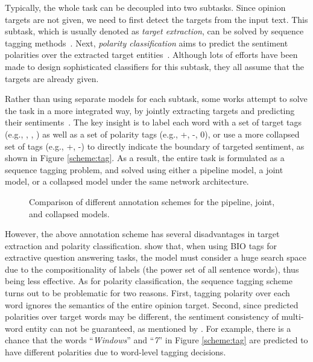 \documentclass[11pt,a4paper]{article}
\begin{document}
Typically, the whole task can be decoupled into two subtasks.
Since opinion targets are not given, we need to first detect the targets from the input text.
This subtask, which is usually denoted as \emph{target extraction}, can be solved by sequence tagging methods~\cite{jakob2010extracting,liu2015fine,wang2016recursive,poria2016aspect,shu2017lifelong,he2017unsupervised,xu2018double}.
Next, \emph{polarity classification} aims to predict the sentiment polarities over the extracted target entities~\cite{jiang2011target,dong2014adaptive,tang2015effective,wang2016attention,chen2017recurrent,xue2018aspect,li2018transformation,fan2018multi}. 
Although lots of efforts have been made to design sophisticated classifiers for this subtask, they all assume that the targets are already given.

Rather than using separate models for each subtask, some works attempt to solve the task in a more integrated way, by jointly extracting targets and predicting their sentiments~\cite{mitchell2013open,zhang2015neural,li2018unified}.
The key insight is to label each word with a set of target tags (e.g., , , ) as well as a set of polarity tags (e.g., +, -, 0), or use a more collapsed set of tags (e.g., +, -) to directly indicate the boundary of targeted sentiment, as shown in Figure \ref{scheme:tag}. 
As a result, the entire task is formulated as a sequence tagging problem, and solved using either a pipeline model, a joint model, or a collapsed model under the same network architecture.

\begin{figure*}
  \centering
  \hspace{0.3in}  
  \caption{Comparison of different annotation schemes for the pipeline, joint, and collapsed models.}
  \label{fig:scheme} \end{figure*}

However, the above annotation scheme has several disadvantages in target extraction and polarity classification.
\citet{lee2016learning} show that, when using BIO tags for extractive question answering tasks, the model must consider a huge search space due to the compositionality of labels (the power set of all sentence words), thus being less effective.
As for polarity classification, the sequence tagging scheme turns out to be problematic for two reasons. 
First, tagging polarity over each word ignores the semantics of the entire opinion target.
Second, since predicted polarities over target words may be different, the sentiment consistency of multi-word entity can not be guaranteed, as mentioned by \citet{li2018unified}.
For example, there is a chance that the words ``\emph{Windows}'' and ``\emph{7}'' in Figure \ref{scheme:tag} are predicted to have different polarities due to word-level tagging decisions.
\end{document}
